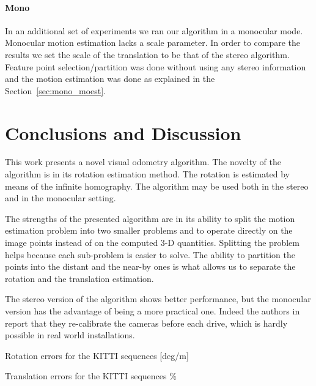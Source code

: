 \paragraph{Mono} In an additional set of experiments we ran our
algorithm in a monocular mode. Monocular motion estimation lacks a
scale parameter. In order to compare the results we set the
scale of the translation to be that of the stereo algorithm.  Feature
point selection/partition was done without using any stereo
information and the motion estimation was done as explained in the
Section~\ref{sec:mono_moest}.

\section{Conclusions and Discussion}
This work presents a novel visual odometry algorithm.  The novelty of
the algorithm is in its rotation estimation method.  The rotation is
estimated by means of the infinite homography.  The algorithm may be
used both in the stereo and in the monocular setting.

The strengths of the presented algorithm are in its ability to split
the motion estimation problem into two smaller problems and to operate
directly on the image points instead of on the computed 3-D
quantities.  Splitting the problem helps because each sub-problem is
easier to solve.  The ability to partition the points into the distant
and the near-by ones is what allows us to separate the rotation and
the translation estimation.  

The stereo version of the algorithm shows better performance, but the
monocular version has the advantage of being a more practical one.
Indeed the authors in~\cite{Geiger2012} report that they re-calibrate
the cameras before each drive, which is hardly possible in real world
installations.

\begin{table}
  \centering
  \caption{Rotation errors for the KITTI sequences [deg/m]}
  \label{table:rot_err}
  \smallskip\noindent
  \resizebox{\linewidth}{!}{%
    
  }
\end{table}

\begin{table}
  \centering
  \caption{Translation errors for the KITTI sequences \% }
  \label{table:trans_err}
  \smallskip\noindent
  \resizebox{\linewidth}{!}{%
    
  }
\end{table}
